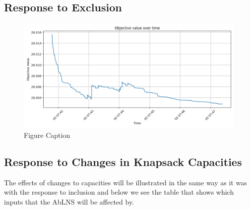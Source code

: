 \subsection{Response to Exclusion}
\begin{figure}[H]
	\centering
	\includegraphics[width=1.0\textwidth]{figures/objective-400-exclusions.png}
	\caption{Figure Caption}\label{fig:objective-exclusion-400}
\end{figure}

\subsection{Response to Changes in Knapsack Capacities}
The effects of changes to capacities will be illustrated in the same way as it was with the response to inclusion and below we see the table that shows which inputs that the AbLNS will be affected by.

